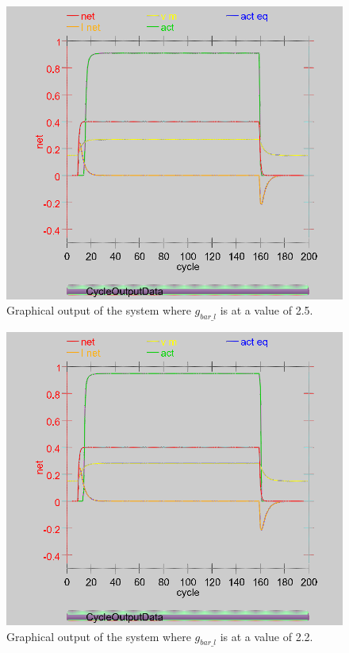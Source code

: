\begin{multicols}{2}
\begin{figure}[H]
\centering
\includegraphics[scale=0.4]{Media/Main/EQ1/2.3.S3G.png}
\caption{Graphical output of the system where $g_{bar\_l}$ is at a value of 2.5.}
\label{Q2.33}
\end{figure}

\begin{figure}[H]
\centering
\includegraphics[scale=0.4]{Media/Main/EQ1/2.3.S4G.png}
\caption{Graphical output of the system where $g_{bar\_l}$ is at a value of 2.2.}
\label{Q2.34}
\end{figure}
\end{multicols}


